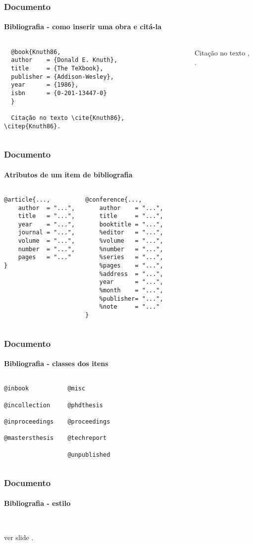 \begin{frame}[fragile]
\frametitle{Documento}
\framesubtitle{Bibliografia - como inserir uma obra e citá-la}
  \scriptsize
  \begin{columns}[c]
  \begin{verbatim}
  @book{Knuth86,
  author    = {Donald E. Knuth},
  title     = {The TeXbook},
  publisher = {Addison-Wesley},
  year      = {1986},
  isbn      = {0-201-13447-0}
  }
  
  Citação no texto \cite{Knuth86}, \citep{Knuth86}.
  \end{verbatim} 
  \begin{fmpage}{\textwidth}
  Citação no texto \cite{Knuth86}, \citep{Knuth86}.
  \end{fmpage}
  \end{columns}
\end{frame}


\begin{frame}[fragile]
\frametitle{Documento}
\framesubtitle{Atributos de um item de bibliografia}
  \scriptsize
  \begin{columns}[c]
  \begin{verbatim}
@article{...,
    author  = "...",
    title   = "...",
    year    = "...",
    journal = "...",
    volume  = "...",
    number  = "...",
    pages   = "..."
}
  \end{verbatim} 
\begin{verbatim}
@conference{...,
    author    = "...",
    title     = "...",
    booktitle = "...",
    %editor   = "...",
    %volume   = "...",
    %number   = "...",
    %series   = "...",
    %pages    = "...",
    %address  = "...",
    year      = "...",
    %month    = "...",
    %publisher= "...",
    %note     = "..."
}
\end{verbatim}
  \end{columns}
\end{frame}


\begin{frame}[fragile]
\frametitle{Documento}
\framesubtitle{Bibliografia - classes dos itens}
  \scriptsize
  \begin{columns}[c]
  \begin{verbatim}
@inbook

@incollection

@inproceedings 

@mastersthesis
  \end{verbatim} 
\begin{verbatim}
@misc 

@phdthesis 

@proceedings 

@techreport 

@unpublished 
\end{verbatim}
  \end{columns}
\end{frame}


\begin{frame}[fragile]
\frametitle{Documento}
\framesubtitle{Bibliografia - estilo}
  \scriptsize
  \begin{verbatim}


  \end{verbatim}
  
  ver slide \pageref{bibliografia}.
\end{frame}


